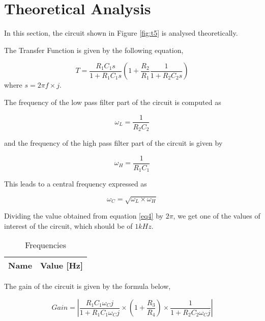 \section{Theoretical Analysis}
\label{sec:analysis}

In this section, the circuit shown in Figure \ref{fig:t5} is analysed 
theoretically.

The Transfer Function is given by the following equation,

\begin{equation} \label{eq1}
T=\frac{R_1 C_1 s}{1+R_1 C_1 s}(1+ \frac{R_2}{R_1} \frac{1}{1+R_2 C_2 s})
\end{equation}
where $s=2\pi f \times j$.

The frequency of the low pass filter part of the circuit is computed as

\begin{equation} \label{eq2}
\omega_L=\frac{1}{R_2 C_2}
\end{equation}

and the frequency of the high pass filter part of the circuit is given by

\begin{equation} \label{eq3}
\omega_H=\frac{1}{R_1 C_1}
\end{equation}

This leads to a central frequency expressed as

\begin{equation} \label{eq4}
\omega_C=\sqrt{\omega_L \times \omega_H}
\end{equation}

Dividing the value obtained from equation \ref{eq4} by $2\pi$, we get one of the values of interest of the circuit, which should be of $1 kHz$. \par

\begin{table}[h]
  \centering
  \begin{tabular}{|l|r|}
    \hline    
    {\bf Name} & {\bf Value [Hz]} \\ \hline
    
  \end{tabular}
  \caption{Frequencies}
  \label{tab:data}
\end{table}
\FloatBarrier


The gain of the circuit is given by the formula below,

\begin{equation} \label{eq5}
Gain = |\frac{R_1 C_1 \omega_C j}{1+R_1 C_1 \omega_C j} \times (1+\frac{R_3}{R_4}) \times \frac{1}{1+R_2 C_2 \omega_C j}|
\end{equation}

